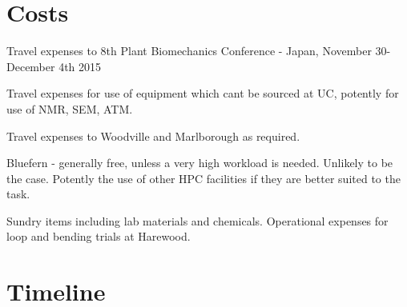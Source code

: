 \documentclass{article}
\begin{document}
\section{Costs}
Travel expenses to 8th Plant Biomechanics Conference - Japan, November
30-December 4th 2015

Travel expenses for use of equipment which cant be sourced at UC,
potently for use of NMR, SEM, ATM.

Travel expenses to Woodville and Marlborough as required.

Bluefern - generally free, unless a very high workload is needed. Unlikely to be
the case. Potently the use of other HPC facilities if they are better suited to
the task.

Sundry items including lab materials and chemicals. Operational
expenses for loop and bending trials at Harewood.

\section{Timeline}
\end{document}
